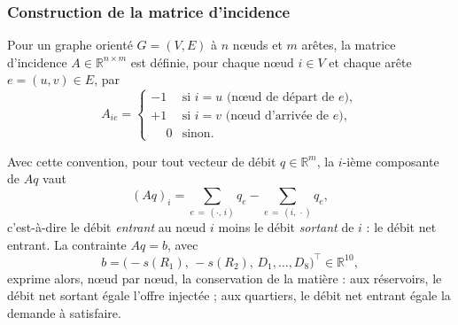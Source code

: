 \documentclass[11pt]{ama-article}
\begin{document}
\subsubsection{Construction de la matrice d'incidence}

\begin{definition}
Pour un graphe orienté $G=(V,E)$ à $n$ nœuds et $m$ arêtes, la matrice d'incidence
$A\in\mathbb{R}^{n\times m}$ est définie, pour chaque nœud $i\in V$ et chaque arête
$e=(u,v)\in E$, par
\begin{equation}
A_{ie} =
\begin{cases}
-1 & \text{si } i=u \text{ (nœud de départ de } e\text{)}, \\
+1 & \text{si } i=v \text{ (nœud d'arrivée de } e\text{)}, \\
\phantom{-}0 & \text{sinon.}
\end{cases}
\label{eq:def-A}
\end{equation}
\end{definition}

Avec cette convention, pour tout vecteur de débit $q\in\mathbb{R}^m$, la $i$-ième composante de
$Aq$ vaut
\begin{equation}
(Aq)_i = \sum_{e\,=\,(\cdot,\,i)} q_e - \sum_{e\,=\,(i,\,\cdot)} q_e,
\label{eq:Aq-i}
\end{equation}
c'est-à-dire le débit \emph{entrant} au nœud $i$ moins le débit \emph{sortant} de $i$ : le débit
net entrant. La contrainte $Aq=b$, avec
\[
b = \big(-s(R_1),\,-s(R_2),\,D_1,\dots,D_8\big)^\top \in \mathbb{R}^{10},
\]
exprime alors, nœud par nœud, la conservation de la matière : aux réservoirs, le débit net
sortant égale l'offre injectée ; aux quartiers, le débit net entrant égale la demande à
satisfaire.
\end{document}
